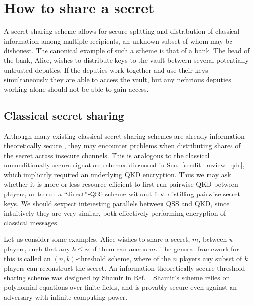 \section{How to share a secret}\label{sec:qss_lit_review}
A secret sharing scheme allows for secure splitting and distribution of classical information among multiple recipients, an unknown subset of whom may be dishonest. The canonical example of such a scheme is that of a bank. The head of the bank, Alice, wishes to distribute keys to the vault between several potentially untrusted deputies. If the deputies work together and use their keys simultaneously they are able to access the vault, but any nefarious deputies working alone should not be able to gain access.




\subsection{Classical secret sharing}\label{sec:qss_qcss}
Although many existing classical secret-sharing schemes are already information-theoretically secure \cite{Shamir1979, Blakley1979}, they may encounter problems when distributing  shares of the secret across insecure channels. This is analogous to the classical unconditionally secure signature schemes \cite{Wallden2015, Amiri2016a} discussed in Sec.~\ref{sec:lit_review_qds}, which implicitly required an underlying QKD encryption. Thus we may ask whether it is more or less resource-efficient to first run pairwise QKD between players, or to run a ``direct''-QSS scheme without first distilling pairwise secret keys. We should sexpect interesting parallels between QSS and QKD, since intuitively they are very similar, both effectively performing encryption of classical messages.

Let us consider some examples. Alice wishes to share a secret, $m$, between $n$ players, such that any $k \le n$ of them can access $m$. The general framework for this is called an $\left(n, k\right)$-threshold scheme, where of the $n$ players any subset of $k$ players can reconstruct the secret. An information-theoretically secure threshold sharing scheme was designed by Shamir in Ref.~\cite{Shamir1979}. Shamir's scheme relies on polynomial equations over finite fields, and is provably secure even against an adversary with infinite computing power. 

